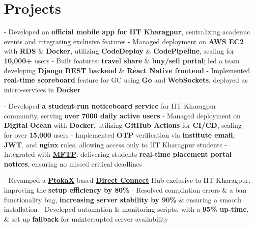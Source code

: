 \documentclass[a4paper,10pt]{extarticle} %
\begin{document}
 \vspace{-0.1cm}
\section{\textcolor{primary}{Projects}}
 \vspace{0.1cm}
\begin{description}[style=nextline, font=$\bullet$\hspace{2mm}\normalsize]

 \item[{\href{https://play.google.com/store/apps/details?id=com.apnainsti&pli=1}{ApnaInsti}} | Python, AWS] 
- Developed an \textbf{official mobile app for IIT Kharagpur}, centralizing academic events and integrating exclusive features \newline
- Managed deployment on \textbf{AWS EC2} with \textbf{RDS} \& \textbf{Docker}, utilizing \textbf{CodeDeploy} \& \textbf{CodePipeline}, scaling for \textbf{10,000+} users \newline
- Built features: \textbf{travel share} \& \textbf{buy/sell portal}; led a team developing \textbf{Django REST backend} \& \textbf{React Native frontend} \newline
- Implemented \textbf{real-time scoreboard} feature for GC using \textbf{Go} and \textbf{WebSockets}, deployed as micro-services in \textbf{Docker}

 \item[{\href{https://naarad.metakgp.org}{Naarad}} | Golang, Python] 
- Developed \textbf{a student-run noticeboard service} for IIT Kharagpur community, serving \textbf{over 7000 daily active users} \newline
- Managed deployment on \textbf{Digital Ocean} with \textbf{Docker}, utilizing \textbf{GitHub Actions} for \textbf{CI/CD}, scaling for over \textbf{15,000} users \newline
- Implemented \textbf{OTP} verification via \textbf{institute email}, \textbf{JWT}, and \textbf{nginx} rules, allowing access only to IIT Kharagpur students \newline
- Integrated with \href{https://github.com/metakgp/mftp}{\textbf{MFTP}}: delivering students \textbf{real-time placement portal notices}, ensuring no missed critical deadlines

\item[{\href{https://github.com/proffapt/Metahub}{Metahub}} | C, Bash, Linux Utilities ]
- Revamped a \href{http://www.ptokax.org/}{\textbf{PtokaX}} based \href{https://en.wikipedia.org/wiki/Direct_Connect_(protocol)}{\textbf{Direct Connect}} Hub exclusive to IIT Kharagpur, improving the \textbf{setup efficiency by 80\%} \newline
- Resolved compilation errors \& a ban functionality bug, \textbf{increasing server stability by 90\%} \& ensuring a smooth installation \newline
- Developed automation \& monitoring scripts, with a \textbf{95\% up-time}, \& set up \textbf{fallback} for uninterrupted server availability


\end{description}
\end{document}
